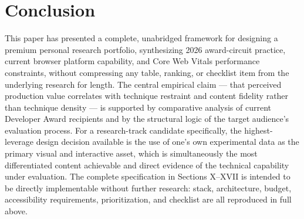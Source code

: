 \documentclass[conference]{IEEEtran}
\begin{document}
\section{Conclusion}

This paper has presented a complete, unabridged framework for designing a premium personal research portfolio, synthesizing 2026 award-circuit practice, current browser platform capability, and Core Web Vitals performance constraints, without compressing any table, ranking, or checklist item from the underlying research for length. The central empirical claim --- that perceived production value correlates with technique restraint and content fidelity rather than technique density --- is supported by comparative analysis of current Developer Award recipients and by the structural logic of the target audience's evaluation process. For a research-track candidate specifically, the highest-leverage design decision available is the use of one's own experimental data as the primary visual and interactive asset, which is simultaneously the most differentiated content achievable and direct evidence of the technical capability under evaluation. The complete specification in Sections X--XVII is intended to be directly implementable without further research: stack, architecture, budget, accessibility requirements, prioritization, and checklist are all reproduced in full above.
\end{document}

